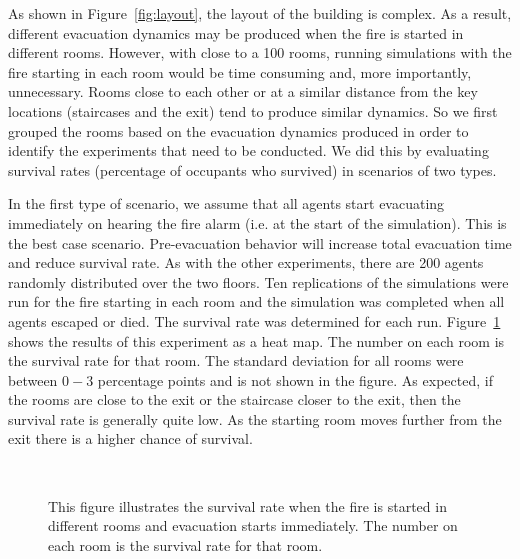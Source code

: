 As shown in Figure~\ref{fig:layout}, the layout of the building is complex. As a result, different evacuation dynamics may be produced when the fire is started in different rooms. However, with close to a 100 rooms, running simulations with the fire starting in each room would be time consuming and, more importantly, unnecessary. Rooms close to each other or at a similar distance from the key locations (staircases and the exit) tend to produce similar dynamics. So we first grouped the rooms based on the evacuation dynamics produced in order to identify the experiments that need to be conducted. We did this by evaluating survival rates (percentage of occupants who survived) in scenarios of two types.

In the first type of scenario, we assume that all agents start evacuating immediately on hearing the fire alarm (i.e. at the start of the simulation). This is the best case scenario. Pre-evacuation behavior will increase total evacuation time and reduce survival rate. As with the other experiments, there are 200 agents randomly distributed over the two floors. Ten replications of the simulations were run for the fire starting in each room and the simulation was completed when all agents escaped or died. The survival rate was determined for each run. Figure~\ref{fig:survivalPlotRoomClassificiationImmediate} shows the results of this experiment as a heat map. The number on each room is the survival rate for that room. The standard deviation for all rooms were between $0-3$ percentage points and is not shown in the figure.
As expected, if the rooms are close to the exit or the staircase closer to the exit, then the survival rate is generally quite low. As the starting room moves further from the exit there is a higher chance of survival.


\begin{figure}[!tbp]
\centering
{}
\\
\caption[Immediate Evacuation Survival Rate Heat Map]{This figure illustrates the survival rate when the fire is started in different rooms and evacuation starts immediately. The number on each room is the survival rate for that room.}
\label{fig:survivalPlotRoomClassificiationImmediate}
\end{figure}

